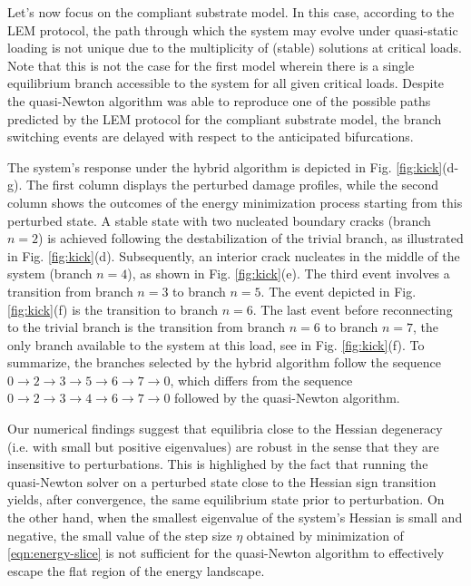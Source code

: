 Let's now  focus on the compliant substrate model. In this case, according to the LEM protocol, the path through which the system may evolve under quasi-static loading is not unique due to the multiplicity of (stable) solutions at critical loads.
Note that this is not the case for the first model wherein there is a single equilibrium branch accessible to the system for all given critical loads.
Despite the quasi-Newton algorithm was able to reproduce one of the possible paths predicted by the LEM protocol for the compliant substrate model,  {the branch switching events} {are delayed with respect to the} anticipated bifurcations. 



The system's response under the hybrid algorithm is depicted in Fig. \ref{fig:kick}(d-g). The first column displays the perturbed damage profiles, while the second column shows the outcomes of the energy minimization process starting from  this perturbed state. A stable state with two nucleated boundary cracks (branch \( n=2 \)) is achieved following the destabilization of the trivial branch, as illustrated in Fig. \ref{fig:kick}(d). Subsequently, an interior crack nucleates in the middle of the system (branch \( n=4 \)), as shown in Fig. \ref{fig:kick}(e). The third event involves a transition from branch \( n=3 \) to branch \( n=5 \). The  event depicted in Fig. \ref{fig:kick}(f) is the transition to branch \( n=6 \). The last event before reconnecting to the trivial branch is the transition from branch \( n=6 \) to branch \( n=7 \), the only  branch available to the system at this load, see in Fig. \ref{fig:kick}(f). To summarize, the branches selected by the hybrid algorithm follow the sequence 
\( 0 \rightarrow 2 \rightarrow 3 \rightarrow 5 \rightarrow 6 \rightarrow 7 \rightarrow 0 \), 
which differs from the sequence 
\( 0 \rightarrow 2 \rightarrow 3 \rightarrow 4 \rightarrow 6 \rightarrow 7 \rightarrow 0 \) 
followed by the quasi-Newton algorithm.

Our numerical findings suggest that equilibria close to the Hessian degeneracy (i.e. with small but positive eigenvalues) are robust in the sense that they are insensitive to perturbations. This is highlighed by the fact that running the quasi-Newton solver on a perturbed state close to the Hessian sign transition yields, after convergence, the same equilibrium state prior to perturbation.
On the other hand, when the smallest eigenvalue of the system's Hessian is small and negative, the
small value of the step size \( \eta \) obtained by minimization of \eqref{eqn:energy-slice} is not sufficient for the quasi-Newton algorithm to effectively escape the flat region of the energy landscape. 

